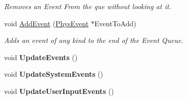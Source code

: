 \begin{DoxyCompactItemize}
\begin{DoxyCompactList}\small\item\em Removes an Event From the que without looking at it. \item\end{DoxyCompactList}\item 
void \hyperlink{classPhysEventManager_a7c9bb46b17f6d9245817a402dc6a2f6f}{AddEvent} (\hyperlink{classPhysEvent}{PhysEvent} $\ast$EventToAdd)
\begin{DoxyCompactList}\small\item\em Adds an event of any kind to the end of the Event Queue. \item\end{DoxyCompactList}\item 
\hypertarget{classPhysEventManager_a34b4b8d35fee0f593fbb32b83843abba}{
void {\bfseries UpdateEvents} ()}
\label{d5/dd7/classPhysEventManager_a34b4b8d35fee0f593fbb32b83843abba}

\item 
\hypertarget{classPhysEventManager_adcdeb687464f00252e1c4052d4b9304e}{
void {\bfseries UpdateSystemEvents} ()}
\label{d5/dd7/classPhysEventManager_adcdeb687464f00252e1c4052d4b9304e}

\item 
\hypertarget{classPhysEventManager_a99f2350628caf751e156107d57646030}{
void {\bfseries UpdateUserInputEvents} ()}
\label{d5/dd7/classPhysEventManager_a99f2350628caf751e156107d57646030}


\end{DoxyCompactItemize}
